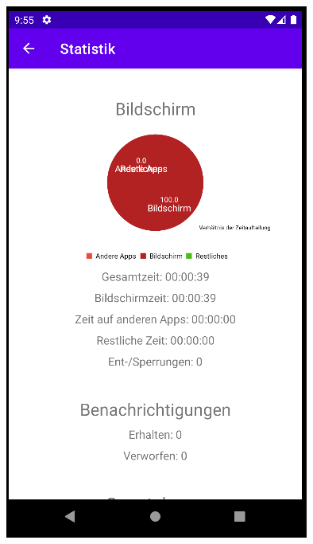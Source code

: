 \documentclass{article}
\begin{document}
\begin{center}
    \includegraphics[scale=0.45]{stats_phase_1.png}
\end{center}
\end{document}
